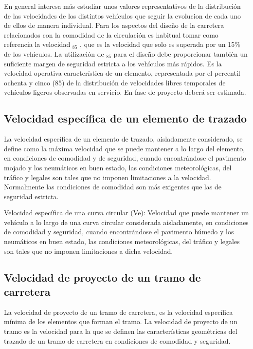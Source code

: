 \documentclass[letterpaper,10pt,english]{sphinxmanual}
\begin{document}
En general interesa más estudiar unos valores representativos de la distribución de las velocidades de los distintos vehículos que seguir la evolucion de cada uno de ellos de manera individual. Para los aspectos del diseño de la carretera relacionados con la comodidad de la circulación es habitual tomar como referencia la velocidad $_{\text{85}}$ , que es la velocidad que solo es superada por un  15\% de los vehículos. La utilización de $_{\text{85}}$ para el diseño debe proporcionar también un suficiente margen de seguridad estricta a los vehículos más rápidos. Es la velocidad operativa característica de un elemento, representada por el percentil
ochenta y cinco (85) de la distribución de velocidades libres temporales de vehículos ligeros observadas en servicio. En fase de proyecto deberá ser estimada.


\subsection{Velocidad específica de un elemento de trazado}
\label{\detokenize{controles:velocidad-especifica-de-un-elemento-de-trazado}}
La velocidad específica de un elemento de trazado, aisladamente considerado, se define como la máxima velocidad que se puede mantener a lo largo del elemento, en condiciones de comodidad y de seguridad, cuando encontrándose el pavimento mojado y los neumáticos en buen estado, las condiciones meteorológicas, del tráfico y legales son tales que no imponen limitaciones a la velocidad. Normalmente las condiciones de comodidad son más exigentes que las de seguridad estricta.

Velocidad específica de una curva circular (Ve): Velocidad que puede mantener un vehículo a lo largo de una curva circular considerada aisladamente, en condiciones de comodidad y seguridad, cuando encontrándose el pavimento húmedo y los neumáticos en buen estado, las condiciones meteorológicas, del tráfico y legales son tales que no
imponen limitaciones a dicha velocidad.


\subsection{Velocidad de proyecto de un tramo de carretera}
\label{\detokenize{controles:velocidad-de-proyecto-de-un-tramo-de-carretera}}
La velocidad de proyecto de un tramo de carretera,  es la velocidad específica mínima de los elementos que forman el tramo. La velocidad de proyecto de un tramo es la velocidad para la que se definen las características geométricas del trazado de un tramo de carretera en condiciones de comodidad y seguridad.
\end{document}
